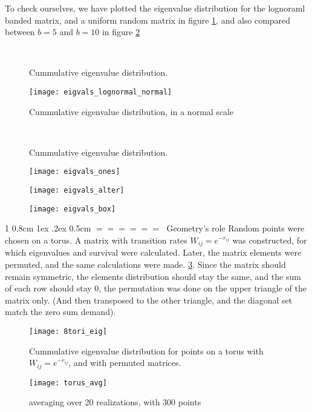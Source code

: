 \documentclass[onecolumn,fleqn,notitlepage,secnumarabic]{revtex4}
\makeatletter
\def\section{%
  \@startsection
    {section}%
    {1}%
    {\z@}%
    {0.8cm \@plus1ex \@minus .2ex}%
    {0.5cm}%
    {\Large\bf $=\!=\!=\!=\!=\!=\;$}%
}%
\makeatother
\begin{document}
To check ourselves, we have plotted the eigenvalue distribution for the lognoraml banded matrix, and a uniform random matrix in figure \ref{fig:eigenvalue_distribution}, and also compared between $b=5$ and $b=10$ in figure \ref{fig:eigenvalue_distribution_5_10}
\begin{figure}
    \\ 
    \caption{Cummulative eigenvalue distribution.}
    \label{fig:eigenvalue_distribution}
\end{figure}
\begin{figure}
    \texttt{[image: eigvals\_lognormal\_normal]}
    \caption{Cummulative eigenvalue distribution, in a normal scale}
\end{figure}
\begin{figure}
    \\ 
    \caption{Cummulative eigenvalue distribution.}
    \label{fig:eigenvalue_distribution_5_10}
\end{figure}
\begin{figure}
    \texttt{[image: eigvals\_ones]}
\end{figure}
\begin{figure}
    \texttt{[image: eigvals\_alter]}
\end{figure}
\begin{figure}
    \texttt{[image: eigvals\_box]}
\end{figure}

\section{Geometry's role} \label{sec:geometry}
Random points were chosen on a torus. A matrix with transition rates $W_{ij} = e^{-r_{ij}}$ was constructed, for which eigenvalues and survival were calculated. Later, the matrix elements were permuted, and the same calculations were made. \ref{fig:distance}. Since the matrix should remain symmetric, the elements distribution should stay the same, and the sum of each row should stay $0$, the permutation was done on the upper triangle of the matrix only. (And then transposed to the other triangle, and the diagonal set match the zero sum demand).
\begin{figure}
    \texttt{[image: 8tori\_eig]}
    \caption{Cummulative eigenvalue distribution for points on a torus with $W_{ij} = e^{-r_{ij}}$, and with permuted matrices.}
    \label{fig:distance}
\end{figure}
\begin{figure}
    \texttt{[image: torus\_avg]}
    \caption{averaging over 20 realizations, with 300 points}
\end{figure}



\end{document}
